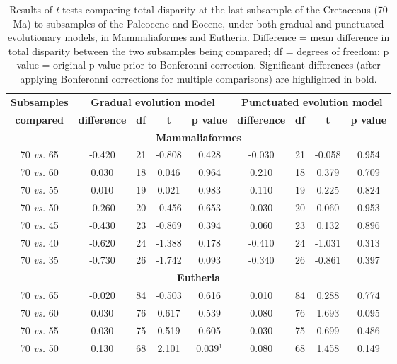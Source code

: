 \documentclass[12pt,letterpaper]{article}
\begin{document}
\begin{table}[ht]
\caption{\scriptsize{Results of \textit{t}-tests comparing total disparity at the last subsample of the Cretaceous (70 Ma) to subsamples of the Paleocene and Eocene, under both gradual and punctuated evolutionary models, in Mammaliaformes and Eutheria. Difference = mean difference in total disparity between the two subsamples being compared; df = degrees of freedom; p value = original p value prior to Bonferonni correction. Significant differences (after applying Bonferonni corrections for multiple comparisons) are highlighted in bold.}}
\label{tab:Tab_results}
\centering
\begin{tabular}{c|cccc|cccc}
  \hline
  \textbf{Subsamples} & \multicolumn{4}{c|}{\textbf{Gradual evolution model}} & \multicolumn{4}{c}{\textbf{Punctuated evolution model}} \\
  \textbf{compared} & \textbf{difference} & \textbf{df} & \textbf{t} & \textbf{p value} & \textbf{difference} & \textbf{df} & \textbf{t} & \textbf{p value} \\ 
  \hline
  \multicolumn{9}{c}{\textbf{Mammaliaformes}}\\
  \hline
  70 \textit{vs.} 65 & -0.420 & 21 & -0.808 & 0.428 & -0.030 & 21 & -0.058 & 0.954 \\ 
  70 \textit{vs.} 60 & 0.030 & 18 & 0.046 & 0.964 & 0.210 & 18 & 0.379 & 0.709 \\ 
  70 \textit{vs.} 55 & 0.010 & 19 & 0.021 & 0.983 & 0.110 & 19 & 0.225 & 0.824 \\ 
  70 \textit{vs.} 50 & -0.260 & 20 & -0.456 & 0.653 & 0.030 & 20 & 0.060 & 0.953 \\ 
  70 \textit{vs.} 45 & -0.430 & 23 & -0.869 & 0.394 & 0.060 & 23 & 0.132 & 0.896 \\ 
  70 \textit{vs.} 40 & -0.620 & 24 & -1.388 & 0.178 & -0.410 & 24 & -1.031 & 0.313 \\ 
  70 \textit{vs.} 35 & -0.730 & 26 & -1.742 & 0.093 & -0.340 & 26 & -0.861 & 0.397 \\ 
  \hline
  \multicolumn{9}{c}{\textbf{Eutheria}}\\
  \hline
  70 \textit{vs.} 65 & -0.020 & 84 & -0.503 & 0.616 & 0.010 & 84 & 0.288 & 0.774 \\ 
  70 \textit{vs.} 60 & 0.030 & 76 & 0.617 & 0.539 & 0.080 & 76 & 1.693 & 0.095 \\ 
  70 \textit{vs.} 55 & 0.030 & 75 & 0.519 & 0.605 & 0.030 & 75 & 0.699 & 0.486 \\ 
  70 \textit{vs.} 50 & 0.130 & 68 & 2.101 & 0.039$^1$ & 0.080 & 68 & 1.458 & 0.149 \\ 

\end{tabular}
\end{table}
\end{document}
